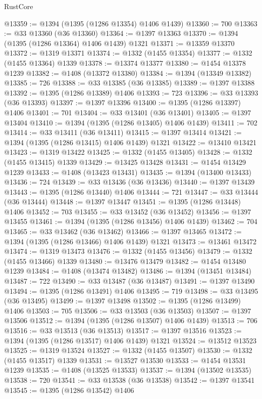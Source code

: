 \begin{lexlean}{RustCore}
\begin{coremodule}
@13359 := @1394 (@1395 (@1286 @13354) @1406 @1439)
@13360 := 700
@13363 := @33 @13360 (@36 @13360)
@13364 := @1397 @13363
@13370 := @1394 (@1395 (@1286 @13364) @1406 @1439) @1321
@13371 := @13359 @13370
@13372 := @1319 @13371
@13374 := @1332 (@1455 @13354)
@13377 := @1332 (@1455 @13364) @1339
@13378 := @13374 @13377
@13380 := @1454 @13378 @1239
@13382 := @1408 (@13372 @13380)
@13384 := @1394 (@13349 @13382)
@13385 := 726
@13388 := @33 @13385 (@36 @13385)
@13389 := @1397 @13388
@13392 := @1395 (@1286 @13389) @1406
@13393 := 723
@13396 := @33 @13393 (@36 @13393)
@13397 := @1397 @13396
@13400 := @1395 (@1286 @13397) @1406
@13401 := 701
@13404 := @33 @13401 (@36 @13401)
@13405 := @1397 @13404
@13410 := @1394 (@1395 (@1286 @13405) @1406 @1439)
@13411 := 702
@13414 := @33 @13411 (@36 @13411)
@13415 := @1397 @13414
@13421 := @1394 (@1395 (@1286 @13415) @1406 @1439) @1321
@13422 := @13410 @13421
@13423 := @1319 @13422
@13425 := @1332 (@1455 @13405)
@13428 := @1332 (@1455 @13415) @1339
@13429 := @13425 @13428
@13431 := @1454 @13429 @1239
@13433 := @1408 (@13423 @13431)
@13435 := @1394 (@13400 @13433)
@13436 := 724
@13439 := @33 @13436 (@36 @13436)
@13440 := @1397 @13439
@13443 := @1395 (@1286 @13440) @1406
@13444 := 721
@13447 := @33 @13444 (@36 @13444)
@13448 := @1397 @13447
@13451 := @1395 (@1286 @13448) @1406
@13452 := 703
@13455 := @33 @13452 (@36 @13452)
@13456 := @1397 @13455
@13461 := @1394 (@1395 (@1286 @13456) @1406 @1439)
@13462 := 704
@13465 := @33 @13462 (@36 @13462)
@13466 := @1397 @13465
@13472 := @1394 (@1395 (@1286 @13466) @1406 @1439) @1321
@13473 := @13461 @13472
@13474 := @1319 @13473
@13476 := @1332 (@1455 @13456)
@13479 := @1332 (@1455 @13466) @1339
@13480 := @13476 @13479
@13482 := @1454 @13480 @1239
@13484 := @1408 (@13474 @13482)
@13486 := @1394 (@13451 @13484)
@13487 := 722
@13490 := @33 @13487 (@36 @13487)
@13491 := @1397 @13490
@13494 := @1395 (@1286 @13491) @1406
@13495 := 719
@13498 := @33 @13495 (@36 @13495)
@13499 := @1397 @13498
@13502 := @1395 (@1286 @13499) @1406
@13503 := 705
@13506 := @33 @13503 (@36 @13503)
@13507 := @1397 @13506
@13512 := @1394 (@1395 (@1286 @13507) @1406 @1439)
@13513 := 706
@13516 := @33 @13513 (@36 @13513)
@13517 := @1397 @13516
@13523 := @1394 (@1395 (@1286 @13517) @1406 @1439) @1321
@13524 := @13512 @13523
@13525 := @1319 @13524
@13527 := @1332 (@1455 @13507)
@13530 := @1332 (@1455 @13517) @1339
@13531 := @13527 @13530
@13533 := @1454 @13531 @1239
@13535 := @1408 (@13525 @13533)
@13537 := @1394 (@13502 @13535)
@13538 := 720
@13541 := @33 @13538 (@36 @13538)
@13542 := @1397 @13541
@13545 := @1395 (@1286 @13542) @1406

\end{coremodule}
\end{lexlean}
